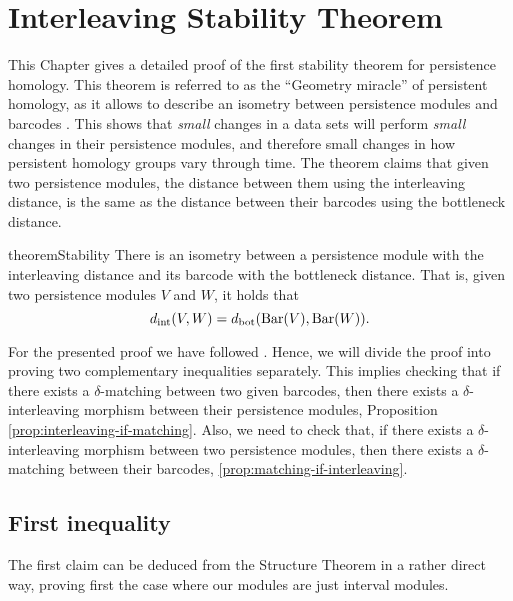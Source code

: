 \chapter{Interleaving Stability Theorem} \label{chap:interleaving-stability}
This Chapter gives a detailed proof of the first stability theorem for persistence homology. This theorem is referred to as the ``Geometry miracle'' of persistent homology, as it allows to describe an isometry between persistence modules and barcodes \cite{nanda}. This shows that {\it small} changes in a data sets will perform {\it small} changes in their persistence modules, and therefore small changes in how persistent homology groups vary through time. The theorem claims that given two persistence modules, the distance between them using the interleaving distance, is the same as the distance between their barcodes using the bottleneck distance.

\begin{restatable}{theorem}{Stability} \label{theorem:stability}
    There is an isometry between a persistence module with the interleaving distance and its barcode with the bottleneck distance. That is, given two persistence modules $ V $ and $ W $, it holds that
    \begin{equation}
        d_{\operatorname{int}} (V, W) = d_{\operatorname{bot}} (\operatorname{Bar}(V), \operatorname{Bar}(W)).
    \end{equation} 
\end{restatable}

For the presented proof we have followed \cite{polterovich}. Hence, we will divide the proof into proving two complementary inequalities separately. This implies checking that if there exists a $\delta$-matching between two given barcodes, then there exists a $\delta$-interleaving morphism between their persistence modules, Proposition \ref{prop:interleaving-if-matching}. Also, we need to check that, if there exists a $\delta$-interleaving morphism between two persistence modules, then there exists a $\delta$-matching between their barcodes, \ref{prop:matching-if-interleaving}.

\section{First inequality}

The first claim can be deduced from the Structure Theorem in a rather direct way, proving first the case where our modules are just interval modules.

